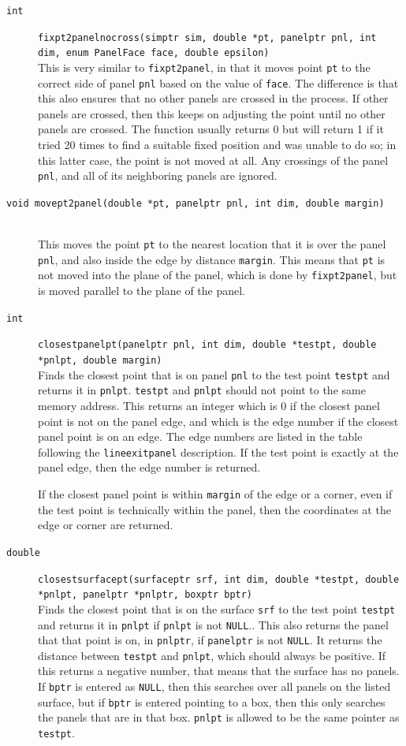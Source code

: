 \documentclass {scrbook}
\newcommand {\ttt} {\texttt}
\begin{document}
\begin{description}
\item[\ttt{int}]
\ttt{fixpt2panelnocross(simptr sim, double *pt, panelptr pnl, int dim, enum PanelFace face, double epsilon)}
\hfill \\
This is very similar to \ttt{fixpt2panel}, in that it moves point \ttt{pt} to the correct side of panel \ttt{pnl} based on the value of \ttt{face}. The difference is that this also ensures that no other panels are crossed in the process. If other panels are crossed, then this keeps on adjusting the point until no other panels are crossed. The function usually returns 0 but will return 1 if it tried 20 times to find a suitable fixed position and was unable to do so; in this latter case, the point is not moved at all. Any crossings of the panel \ttt{pnl}, and all of its neighboring panels are ignored.

\item[\ttt{void movept2panel(double *pt, panelptr pnl, int dim, double margin)}]
\hfill \\
This moves the point \ttt{pt} to the nearest location that it is over the panel \ttt{pnl}, and also inside the edge by distance \ttt{margin}. This means that \ttt{pt} is not moved into the plane of the panel, which is done by \ttt{fixpt2panel}, but is moved parallel to the plane of the panel.

\item[\ttt{int}]
\ttt{closestpanelpt(panelptr pnl, int dim, double *testpt, double *pnlpt, double margin)}
\hfill \\
Finds the closest point that is on panel \ttt{pnl} to the test point \ttt{testpt} and returns it in \ttt{pnlpt}. \ttt{testpt} and \ttt{pnlpt} should not point to the same memory address. This returns an integer which is 0 if the closest panel point is not on the panel edge, and which is the edge number if the closest panel point is on an edge. The edge numbers are listed in the table following the \ttt{lineexitpanel} description. If the test point is exactly at the panel edge, then the edge number is returned.

If the closest panel point is within \ttt{margin} of the edge or a corner, even if the test point is technically within the panel, then the coordinates at the edge or corner are returned.

\item[\ttt{double}]
\ttt{closestsurfacept(surfaceptr srf, int dim, double *testpt, double *pnlpt, panelptr *pnlptr, boxptr bptr)}
\hfill \\
Finds the closest point that is on the surface \ttt{srf} to the test point \ttt{testpt} and returns it in \ttt{pnlpt} if \ttt{pnlpt} is not \ttt{NULL}.. This also returns the panel that that point is on, in \ttt{pnlptr}, if \ttt{panelptr} is not \ttt{NULL}. It returns the distance between \ttt{testpt} and \ttt{pnlpt}, which should always be positive. If this returns a negative number, that means that the surface has no panels. If \ttt{bptr} is entered as \ttt{NULL}, then this searches over all panels on the listed surface, but if \ttt{bptr} is entered pointing to a box, then this only searches the panels that are in that box. \ttt{pnlpt} is allowed to be the same pointer as \ttt{testpt}.


\end{description}
\end{document}
